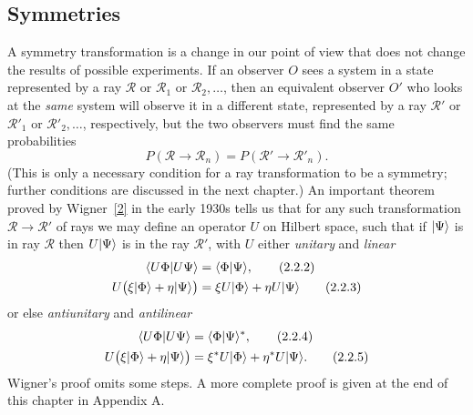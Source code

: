 \subsection{Symmetries}

A symmetry transformation is a change in our point of view that does not
change the results of possible experiments. If an observer $O$ sees a system
in a state represented by a ray $\mathcal{R}$ or $\mathcal{R}_1$ or
$\mathcal{R}_2,\ldots$, then an equivalent observer $O'$ who looks at the
\emph{same} system will observe it in a different state, represented by a ray
$\mathcal{R}'$ or $\mathcal{R}'_1$ or $\mathcal{R}'_2,\ldots$, respectively,
but the two observers must find the same probabilities
\begin{equation}
  P(\mathcal{R}\to\mathcal{R}_n)
    =P(\mathcal{R}'\to\mathcal{R}'_n).
  \tag{2.2.1}\label{eq:2.2.1}
\end{equation}
(This is only a necessary condition for a ray transformation to be a
symmetry; further conditions are discussed in the next chapter.) An
important theorem proved by Wigner~\hyperref[ref:2.2]{[2]} in the early 1930s
tells us that for any such transformation $\mathcal{R}\to\mathcal{R}'$ of
rays we may define an operator $U$ on Hilbert space, such that if
$\lvert \Psi\rangle$ is in ray $\mathcal{R}$ then $U\lvert \Psi\rangle$ is in the ray
$\mathcal{R}'$, with $U$ either \emph{unitary} and \emph{linear}
\begin{align}
  \langle U\Phi | U\Psi\rangle &= \langle \Phi | \Psi\rangle,
  \tag{2.2.2}\label{eq:2.2.2}\\
  U\bigl(\xi\lvert \Phi\rangle+\eta\lvert \Psi\rangle\bigr)
    &=\xi U\lvert \Phi\rangle+\eta U\lvert \Psi\rangle
  \tag{2.2.3}\label{eq:2.2.3}
\end{align}
or else \emph{antiunitary} and \emph{antilinear}
\begin{align}
  \langle U\Phi | U\Psi\rangle &= \langle \Phi | \Psi\rangle^{*},
  \tag{2.2.4}\label{eq:2.2.4}\\
  U\bigl(\xi\lvert \Phi\rangle+\eta\lvert \Psi\rangle\bigr)
    &=\xi^{*}U\lvert \Phi\rangle+\eta^{*}U\lvert \Psi\rangle.
  \tag{2.2.5}\label{eq:2.2.5}
\end{align}
Wigner's proof omits some steps. A more complete proof is given at the
end of this chapter in Appendix A.

